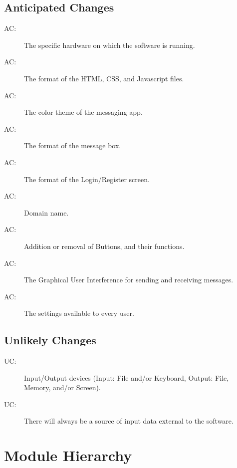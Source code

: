 \documentclass[12pt, titlepage]{article}
\newcounter{acnum}
\newcommand{\actheacnum}{AC\theacnum}
\newcounter{ucnum}
\newcommand{\uctheucnum}{UC\theucnum}
\begin{document}
\subsection{Anticipated Changes} \label{SecAchange}
\begin{description}
\item[ \actheacnum \label{acHardware}:] The specific hardware on which the software is running.
\item[ \actheacnum \label{acInput}:] The format of the HTML, CSS, and Javascript files.
\item[ \actheacnum \label{acInput}:] The color theme of the messaging app.
\item[ \actheacnum \label{acInput}:] The format of the message box.
\item[ \actheacnum \label{acInput}:] The format of the Login/Register screen.
\item[ \actheacnum \label{acInput}:] Domain name.
\item[ \actheacnum \label{acInput}:] Addition or removal of Buttons, and their functions.
\item[ \actheacnum \label{acInput}:] The Graphical User Interference for sending and receiving messages.
\item[ \actheacnum \label{acInput}:] The settings available to every user.
\end{description}

\subsection{Unlikely Changes} \label{SecUchange}
\begin{description}
\item[ \uctheucnum \label{ucIO}:] Input/Output devices
  (Input: File and/or Keyboard, Output: File, Memory, and/or Screen).
\item[ \uctheucnum \label{ucInput}:] There will always be
  a source of input data external to the software.
\end{description}

\section{Module Hierarchy} \label{SecMH}
\end{document}
